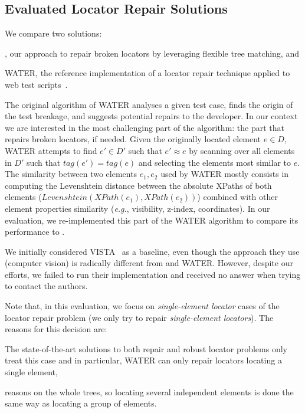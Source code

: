 \subsection{Evaluated Locator Repair Solutions}\label{sec:consideredSolutions}
We compare two solutions: 
\begin{inparaenum}
    \item \erratum{}, our approach to repair broken locators by leveraging flexible tree matching, and
    \item WATER, the reference implementation of a locator repair technique applied to web test scripts~\cite{choudhary2011water}.
\end{inparaenum}

The original algorithm of WATER analyses a given test case, finds the origin of the test breakage, and suggests potential repairs to the developer.
In our context we are interested in the most challenging part of the algorithm: the part that repairs broken locators, if needed.
Given the originally located element $e \in D$, WATER attempts to find $e' \in D'$ such that $e' \approx e$ by scanning over all elements in $D'$ such that $tag(e') = tag(e)$ and selecting the elements most similar to $e$. 
The similarity between two elements $e_1, e_2$ used by WATER mostly consists in computing the Levenshtein distance between the absolute XPaths of both elements ($Levenshtein(XPath(e_1), XPath(e_2))$) combined with other element properties similarity (\emph{e.g.}, visibility, z-index, coordinates).
In our evaluation, we re-implemented this part of the WATER algorithm to compare its performance to \erratum{}.

We initially considered VISTA~\cite{stocco2018visual} as a baseline, even though the approach they use (computer vision) is radically different from \erratum{} and WATER.
However, despite our efforts, we failed to run their implementation and received no answer when trying to contact the authors. 

Note that, in this evaluation, we focus on \textit{single-element locator} cases of the locator repair problem (we only try to repair \textit{single-element locators}).
The reasons for this decision are:
\begin{inparaenum}
    \item The state-of-the-art solutions to both repair and robust locator problems only treat this case and in particular, WATER can only repair locators locating a single element,
    \item \erratum{} reasons on the whole trees, so locating several independent elements is done the same way as locating a group of elements.
\end{inparaenum}

